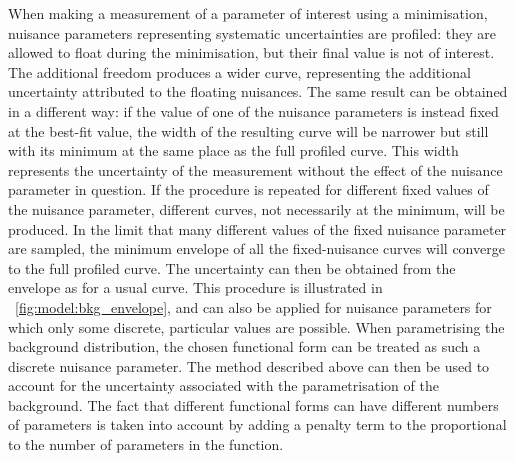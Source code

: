 When making a measurement of a parameter of interest using a \NLL minimisation, nuisance parameters representing systematic uncertainties are profiled: they are allowed to float during the minimisation, but their final value is not of interest. The additional freedom produces a wider \NLL curve, representing the additional uncertainty attributed to the floating nuisances. 
The same result can be obtained in a different way: if the value of one of the nuisance parameters is instead fixed at the best-fit value, the width of the resulting \NLL curve will be narrower but still with its minimum at the same place as the full profiled \NLL curve. This width represents the uncertainty of the measurement without the effect of the nuisance parameter in question. If the procedure is repeated for different fixed values of the nuisance parameter, different \NLL curves, not necessarily at the minimum, will be produced. In the limit that many different values of the fixed nuisance parameter are sampled, the minimum envelope of all the fixed-nuisance \NLL curves will converge to the full profiled \NLL curve. The uncertainty can then be obtained from the envelope as for a usual \NLL curve. This procedure is illustrated in \Fig~\ref{fig:model:bkg_envelope}, and can also be applied for nuisance parameters for which only some discrete, particular values are possible. When parametrising the background distribution, the chosen functional form can be treated as such a discrete nuisance parameter. The method described above can then be used to account for the uncertainty associated with the parametrisation of the background. The fact that different functional forms can have different numbers of parameters is taken into account by adding a penalty term to the \NLL proportional to the number of parameters in the function. 

